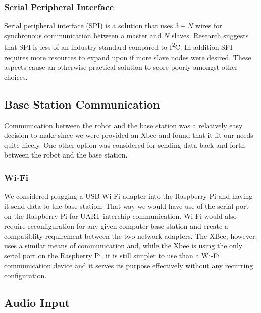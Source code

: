 \documentclass{article}
\begin{document}
        \subsubsection{Serial Peripheral Interface}
            
            Serial peripheral interface (SPI)
            is a solution that uses $3 + N$ wires
            for synchronous communication between a master and $N$ slaves.
            Research suggests that SPI is less of an industry standard
            compared to I\textsuperscript{2}C.
            In addition SPI requires more resources to expand upon
            if more slave nodes were desired. These aspects cause an otherwise
            practical solution to score poorly amongst other choices.
        
    \subsection{Base Station Communication} %
        \label{sub:base_station_communication}
        
        Communication between the robot and the base station was a
        relatively easy decision to make since we were provided an Xbee
        and found that it fit our needs quite nicely.
        One other option was considered for sending data 
        back and forth between the robot and the base station. 
        
        \subsubsection{Wi-Fi}
            
            We considered plugging a USB Wi-Fi adapter into the Raspberry Pi
            and having it send data to the base station.
            That way we would have use of the serial port on the Raspberry Pi for
            UART interchip communication.
            Wi-Fi would also require reconfiguration for any given computer
            base station and create a compatiblity requirement
            between the two network adapters.
            The XBee, however, uses a similar means of communication
            and, while the Xbee is using the only serial port on the Raspberry Pi,
            it is still simpler to use than a Wi-Fi communication device
            and it serves its purpose effectively without any recurring configuration.
    
        
    \subsection{Audio Input} %
        \label{sub:audio_input_options}
        
\end{document}
